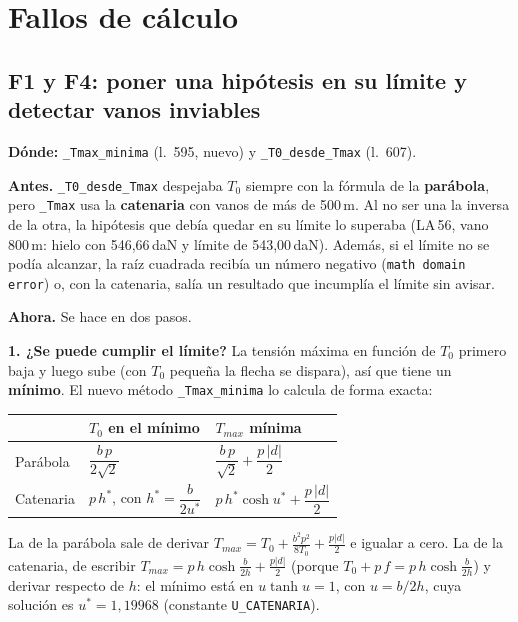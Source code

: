 \documentclass[11pt,a4paper]{article}
\newcommand{\code}[1]{\texttt{#1}}
\newcommand{\antes}[1]{\noindent\textcolor{antes}{\textbf{Antes.}} #1\par\smallskip}
\newcommand{\ahora}[1]{\noindent\textcolor{ahora}{\textbf{Ahora.}} #1\par\smallskip}
\begin{document}
\section{Fallos de cálculo}

\subsection{F1 y F4: poner una hipótesis en su límite y detectar vanos inviables}

\noindent\textbf{Dónde:} \code{\_Tmax\_minima} (l.~595, nuevo) y \code{\_T0\_desde\_Tmax} (l.~607).\par\medskip

\antes{\code{\_T0\_desde\_Tmax} despejaba $T_0$ siempre con la fórmula de la \textbf{parábola}, pero \code{\_Tmax} usa la \textbf{catenaria} con vanos de más de 500\,m. Al no ser una la inversa de la otra, la hipótesis que debía quedar en su límite lo superaba (LA\,56, vano 800\,m: hielo con 546,66\,daN y límite de 543,00\,daN). Además, si el límite no se podía alcanzar, la raíz cuadrada recibía un número negativo (\code{math domain error}) o, con la catenaria, salía un resultado que incumplía el límite sin avisar.}

\ahora{Se hace en dos pasos.}

\textbf{1. ¿Se puede cumplir el límite?} La tensión máxima en función de $T_0$ primero baja y luego sube (con $T_0$ pequeña la flecha se dispara), así que tiene un \textbf{mínimo}. El nuevo método \code{\_Tmax\_minima} lo calcula de forma exacta:

\begin{center}
\begin{tabular}{lll}
\toprule
 & $T_0$ en el mínimo & $T_{max}$ mínima \\
\midrule
Parábola  & $\dfrac{b\,p}{2\sqrt2}$ & $\dfrac{b\,p}{\sqrt2} + \dfrac{p\,|d|}{2}$ \\[1em]
Catenaria & $p\,h^*$, con $h^* = \dfrac{b}{2u^*}$ & $p\,h^*\cosh u^* + \dfrac{p\,|d|}{2}$ \\
\bottomrule
\end{tabular}
\end{center}

La de la parábola sale de derivar $T_{max} = T_0 + \frac{b^2p^2}{8T_0} + \frac{p|d|}{2}$ e igualar a cero. La de la catenaria, de escribir $T_{max} = p\,h\cosh\frac{b}{2h} + \frac{p|d|}{2}$ (porque $T_0 + p\,f = p\,h\cosh\frac{b}{2h}$) y derivar respecto de $h$: el mínimo está en $u\tanh u = 1$, con $u = b/2h$, cuya solución es $u^* = 1{,}19968$ (constante \code{U\_CATENARIA}).
\end{document}
